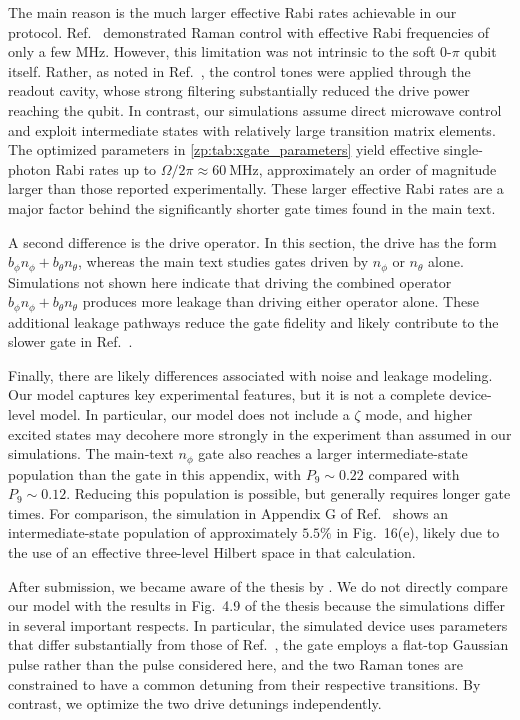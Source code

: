 The main reason is the much larger effective Rabi rates achievable in our protocol.
Ref.~\cite{Gyenis_zero_pi_2021a} demonstrated Raman control with effective Rabi frequencies of only a few MHz.
However, this limitation was not intrinsic to the soft 0-$\pi$ qubit itself.
Rather, as noted in Ref.~\cite{Gyenis_zero_pi_2021a}, the control tones were applied through the readout cavity, whose strong filtering substantially reduced the drive power reaching the qubit.
In contrast, our simulations assume direct microwave control and exploit intermediate states with relatively large transition matrix elements.
The optimized parameters in \cref{zp:tab:xgate_parameters} yield effective single-photon Rabi rates up to $\Omega/2\pi \approx 60~\mathrm{MHz}$, approximately an order of magnitude larger than those reported experimentally.
These larger effective Rabi rates are a major factor behind the significantly shorter gate times found in the main text.

A second difference is the drive operator.
In this section, the drive has the form $b_\phi n_\phi + b_\theta n_\theta$, whereas the main text studies gates driven by $n_\phi$ or $n_\theta$ alone.
Simulations not shown here indicate that driving the combined operator $b_\phi n_\phi + b_\theta n_\theta$ produces more leakage than driving either operator
alone.
These additional leakage pathways reduce the gate fidelity and likely contribute to the slower gate in Ref.~\cite{Gyenis_zero_pi_2021a}.

Finally, there are likely differences associated with noise and leakage modeling.
Our model captures key experimental features, but it is not a complete device-level model.
In particular, our model does not include a $\zeta$ mode, and higher excited states may decohere more strongly in the experiment than assumed in our simulations.
The main-text $n_\phi$ gate also reaches a larger intermediate-state population than the gate in this appendix, with $P_9\sim 0.22$ compared with $P_9\sim 0.12$.
Reducing this population is possible, but generally requires longer gate times.
For comparison, the simulation in Appendix G of Ref.~\cite{Gyenis_zero_pi_2021a} shows an intermediate-state population of approximately $5.5\%$ in Fig.~16(e), likely due to the use of an effective three-level Hilbert space in that calculation.

After submission, we became aware of the thesis by \citet{premkumar2023hamiltonian}.
We do not directly compare our model with the results in Fig.~4.9 of the thesis because the simulations differ in several important respects.
In particular, the simulated device uses parameters that differ substantially from those of Ref.~\cite{Gyenis_zero_pi_2021a}, the gate employs a flat-top Gaussian pulse rather than the pulse considered here, and the two Raman tones are constrained to have a common detuning from their respective transitions.
By contrast, we optimize the two drive detunings independently.

